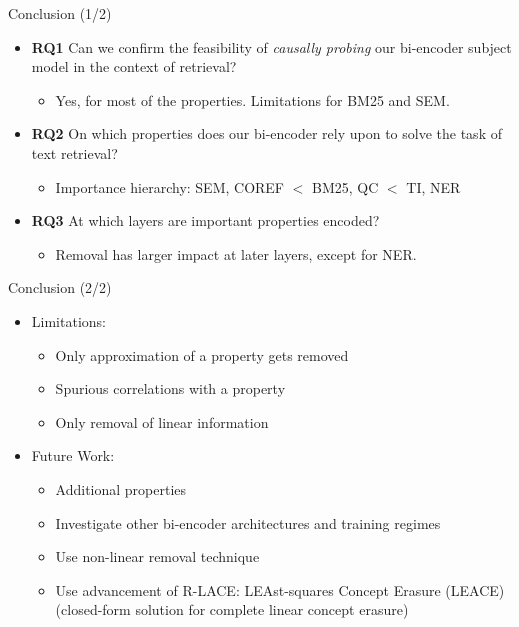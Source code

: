 \documentclass[aspectratio=169]{beamer}
\begin{document}
\begin{frame}{Conclusion (1/2)}
    \begin{itemize}
        \item \scriptsize{\textbf{RQ1} Can we confirm the feasibility of \textit{causally probing} our bi-encoder subject model in the context of retrieval?}
              \begin{itemize}
                  \item Yes, for most of the properties. Limitations for BM25 and SEM.
              \end{itemize}
        \item \scriptsize{\textbf{RQ2} On which properties does our bi-encoder rely upon to solve the task of text retrieval?}
              \begin{itemize}
                  \item Importance hierarchy: SEM, COREF $<$ BM25, QC $<$ TI, NER
              \end{itemize}
        \item \scriptsize{\textbf{RQ3} At which layers are important properties encoded?}
              \begin{itemize}
                  \item Removal has larger impact at later layers, except for NER.
              \end{itemize}
    \end{itemize}
\end{frame}

\begin{frame}{Conclusion (2/2)}
    \begin{itemize}
        \item \large Limitations:
              \begin{itemize}
                  \item Only approximation of a property gets removed
                  \item Spurious correlations with a property
                  \item Only removal of linear information
              \end{itemize}
        \item \large Future Work:
              \begin{itemize}
                  \item Additional properties
                  \item Investigate other bi-encoder architectures and training regimes
                  \item Use non-linear removal technique \cite{Kernelized_concept_Erasure}
                  \item Use advancement of R-LACE: LEAst-squares Concept Erasure (LEACE) \cite{leace} (closed-form solution for complete linear concept erasure)
              \end{itemize}
    \end{itemize}
\end{frame}
\end{document}
